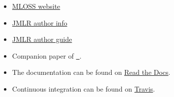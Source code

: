 \documentclass[twoside,11pt]{article}
\begin{document}

\newpage

  \begin{itemize}
    \item \href{http://www.jmlr.org/mloss/mloss-info.html}{MLOSS website}
    \item \href{http://jmlr.csail.mit.edu/author-info.html}{JMLR author info}
    \item \href{http://www.jmlr.org/format/authors-guide.html}{JMLR author guide} 
  \end{itemize}

  \begin{itemize}
    \item Companion paper of \href{https://github.com/guilgautier/DPPy}{\DPPy\ \faGithub}.
    \item The documentation can be found on \href{https://dppy.readthedocs.io/en/latest/?badge=latest}{Read the Docs}.
    \item Continuous integration can be found on \href{https://travis-ci.com/guilgautier/DPPy}{Travis}.
  \end{itemize}

\newpage



\end{document}

